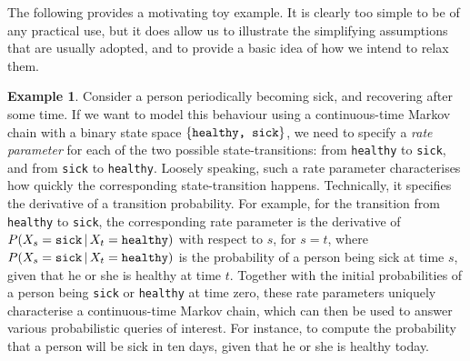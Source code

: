 \documentclass[10pt,a4paper]{paper}
\theoremstyle{definition}
\newtheorem{exmp}{Example}
\begin{document}
The following provides a motivating toy example. 
It is clearly too simple to be of any practical use, but it does allow us to illustrate the simplifying assumptions that are usually adopted, and to provide a basic idea of how we intend to relax them.

\vspace{10pt}

\begin{exmp}\label{ex:health_sick_exmp}
Consider a person periodically becoming sick, and recovering after some time. If we want to model this behaviour using a continuous-time Markov chain with a binary state space $\{\text{\tt healthy, sick}\}$, we need to specify a \emph{rate parameter} for each of the two possible state-transitions: from {\tt healthy} to {\tt sick}, and from {\tt sick} to {\tt healthy}. Loosely speaking, such a rate parameter characterises how quickly the corresponding state-transition happens. Technically, it specifies the derivative of a transition probability. For example, for the transition from {\tt healthy} to {\tt sick}, the corresponding rate parameter is the derivative of $P(X_s={\tt sick}\,\vert\,X_t={\tt healthy})$ with respect to $s$, for $s=t$, where $P(X_s={\tt sick}\,\vert\,X_t={\tt healthy})$ is the probability of a person being sick at time $s$, given that he or she is healthy at time $t$. Together with the initial probabilities of a person being {\tt sick} or {\tt healthy} at time zero, these rate parameters uniquely characterise a continuous-time Markov chain, which can then be used to answer various probabilistic queries of interest.
For instance, to compute the probability that a person will be sick in ten days, given that he or she is healthy today.


\end{exmp}
\end{document}
